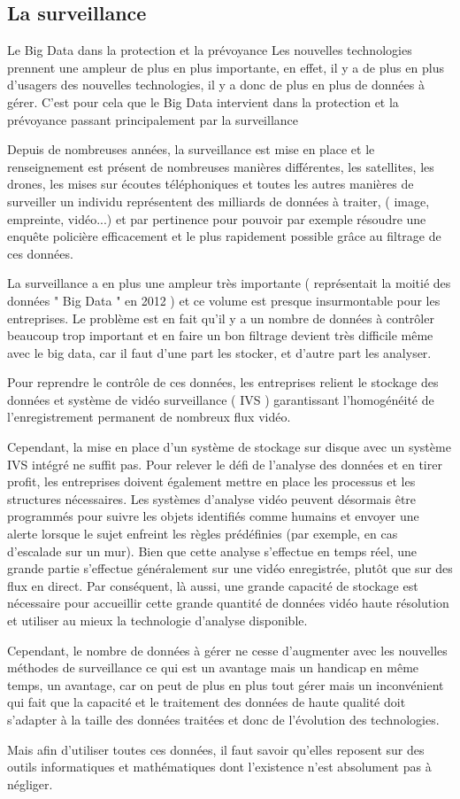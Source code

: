 \documentclass[12pt]{article}
\begin{document}
\subsection{La surveillance}
Le Big Data dans la protection et la prévoyance
Les nouvelles technologies prennent une ampleur de plus en plus importante, en effet, il y a de plus en plus d'usagers des nouvelles technologies, il y a donc de plus en plus de données à gérer. C'est pour cela que le Big Data intervient dans la protection et la prévoyance passant principalement par la surveillance 
\par
Depuis de nombreuses années, la surveillance est mise en place et le renseignement est présent de nombreuses manières différentes, les satellites, les drones, les mises sur écoutes téléphoniques et toutes les autres manières de surveiller un individu représentent des milliards de données à traiter, ( image, empreinte, vidéo...) et par pertinence pour pouvoir par exemple résoudre une enquête policière efficacement et le plus rapidement possible grâce au filtrage de ces données.\par
La surveillance a en plus une ampleur très importante ( représentait la moitié des données " Big Data " en 2012 ) et ce volume est presque insurmontable pour les entreprises.
Le problème est en fait qu'il y a un nombre de données à contrôler beaucoup trop important et en faire un bon filtrage devient très difficile même avec le big data, car il faut d'une part les stocker, et d'autre part les analyser.\par
Pour reprendre le contrôle de ces données, les entreprises relient le stockage des données et système de vidéo surveillance ( IVS ) garantissant l'homogénéité de l'enregistrement permanent de nombreux flux vidéo.\par
Cependant, la mise en place d'un système de stockage sur disque avec un système IVS intégré ne suffit pas. Pour relever le défi de l'analyse des données et en tirer profit, les entreprises doivent également mettre en place les processus et les structures nécessaires. Les systèmes d'analyse vidéo peuvent désormais être programmés pour suivre les objets identifiés comme humains et envoyer une alerte lorsque le sujet enfreint les règles prédéfinies (par exemple, en cas d'escalade sur un mur). Bien que cette analyse s'effectue en temps réel, une grande partie s'effectue généralement sur une vidéo enregistrée, plutôt que sur des flux en direct. Par conséquent, là aussi, une grande capacité de stockage est nécessaire pour accueillir cette grande quantité de données vidéo haute résolution et utiliser au mieux la technologie d'analyse disponible.\par
Cependant, le nombre de données à gérer ne cesse d'augmenter avec les nouvelles méthodes de surveillance ce qui est un avantage mais un handicap en même temps, un avantage, car on peut de plus en plus tout gérer mais un inconvénient qui fait que la capacité et le traitement des données de haute qualité doit s'adapter à la taille des données traitées et donc de l'évolution des technologies.\par
Mais afin d'utiliser toutes ces données, il faut savoir qu'elles reposent sur des outils informatiques et mathématiques dont l'existence n'est absolument pas à négliger.
\pagebreak
\end{document}
